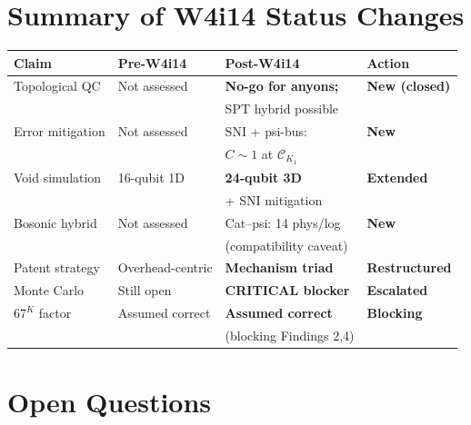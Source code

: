 \documentclass[11pt]{article}
\theoremstyle{definition}
\theoremstyle{remark}
\newcommand{\CK}{\mathcal{C}_K}
\begin{document}
\section{Summary of W4i14 Status Changes}
\label{sec:status-changes}

\begin{center}
\begin{tabular}{@{}llll@{}}
\toprule
Claim & Pre-W4i14 & Post-W4i14 & Action \\
\midrule
Topological QC & Not assessed & \textbf{No-go for anyons;} & \textbf{New (closed)} \\
 & & SPT hybrid possible & \\
Error mitigation & Not assessed & SNI + psi-bus: & \textbf{New} \\
 & & $C \sim 1$ at $\CK_1$ & \\
Void simulation & 16-qubit 1D & \textbf{24-qubit 3D} & \textbf{Extended} \\
 & & + SNI mitigation & \\
Bosonic hybrid & Not assessed & Cat--psi: 14 phys/log & \textbf{New} \\
 & & (compatibility caveat) & \\
Patent strategy & Overhead-centric & \textbf{Mechanism triad} & \textbf{Restructured} \\
Monte Carlo & Still open & \textbf{CRITICAL blocker} & \textbf{Escalated} \\
$67^K$ factor & Assumed correct & \textbf{Assumed correct} & \textbf{Blocking} \\
 & & (blocking Findings 2,4) & \\
\bottomrule
\end{tabular}
\end{center}

\section{Open Questions}
\label{sec:open-questions}
\end{document}
